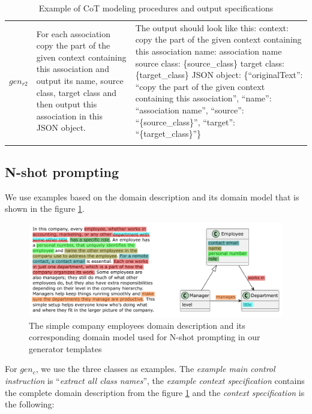 \begin{table}[!h]
\begin{tabular}{@{}l>{\raggedright\arraybackslash}p{}>{\raggedright\arraybackslash}p{}@{}}
$gen_{r2}$ & For each association copy the part of the given context containing this association and output its name, source class, target class and then output this association in this JSON object. &
The output should look like this: \newline
context: copy the part of the given context containing this association \newline
name: association name \newline
source class: \{source\_class\} \newline
target class: \{target\_class\} \newline
JSON object: \{``originalText'': ``copy the part of the given context containing this association'', ``name'': ``association name'', ``source'': ``\{source\_class\}'', ``target'': ``\{target\_class\}''\} \\

	\addlinespace
	\bottomrule
	\addlinespace
	\end{tabular}
	\caption{Example of CoT modeling procedures and output specifications}
	\label{tab:cot-prompt-templates}
\end{table}


\subsection{N-shot prompting}

We use examples based on the domain description and its domain model that is shown in the figure \ref{fig:prompting-domain}.

\begin{figure}[!h]
    \centering
    \includegraphics[scale=0.6]{img/prompting-domain.pdf}
    \caption{\centering The simple company employees domain description and its corresponding domain model used for N-shot prompting in our generator templates}
    \label{fig:prompting-domain}
\end{figure}

For $gen_c$, we use the three classes as examples. The \emph{example main control instruction} is ``\textit{extract all class names}'', the \emph{example context specification} contains the complete domain description from the figure \ref{fig:prompting-domain} and the \emph{context specification} is the following: \\


